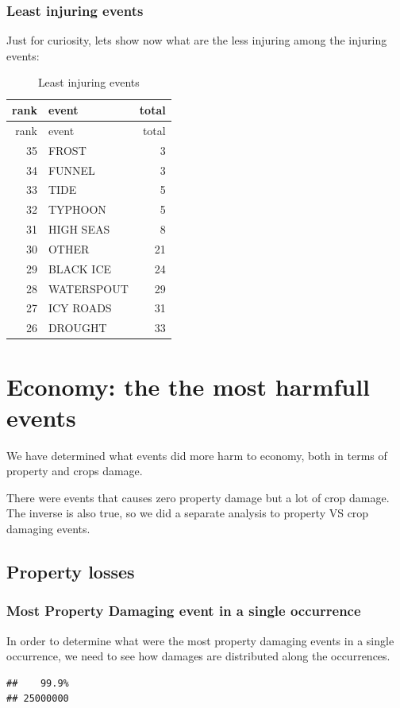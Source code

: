 \documentclass[]{article}
\begin{document}
\subsubsection{Least injuring events}\label{least-injuring-events}

Just for curiosity, lets show now what are the less injuring among the
injuring events:

\begin{longtable}[]{@{}rlr@{}}
\caption{Least injuring events}\tabularnewline
\toprule
rank & event & total\tabularnewline
\midrule
\endfirsthead
\toprule
rank & event & total\tabularnewline
\midrule
\endhead
35 & FROST & 3\tabularnewline
34 & FUNNEL & 3\tabularnewline
33 & TIDE & 5\tabularnewline
32 & TYPHOON & 5\tabularnewline
31 & HIGH SEAS & 8\tabularnewline
30 & OTHER & 21\tabularnewline
29 & BLACK ICE & 24\tabularnewline
28 & WATERSPOUT & 29\tabularnewline
27 & ICY ROADS & 31\tabularnewline
26 & DROUGHT & 33\tabularnewline
\bottomrule
\end{longtable}

\section{Economy: the the most harmfull
events}\label{economy-the-the-most-harmfull-events}

We have determined what events did more harm to economy, both in terms
of property and crops damage.

There were events that causes zero property damage but a lot of crop
damage. The inverse is also true, so we did a separate analysis to
property VS crop damaging events.

\subsection{Property losses}\label{property-losses}

\subsubsection{Most Property Damaging event in a single
occurrence}\label{most-property-damaging-event-in-a-single-occurrence}

In order to determine what were the most property damaging events in a
single occurrence, we need to see how damages are distributed along the
occurrences.

\begin{verbatim}
##    99.9% 
## 25000000
\end{verbatim}
\end{document}
